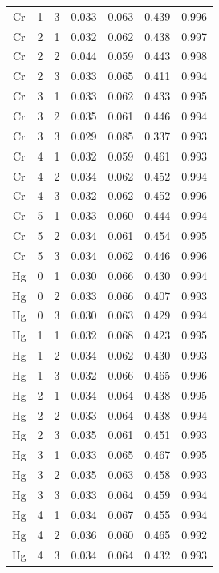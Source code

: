 \documentclass[ms, hidelinks]{uncgdissertationexp}
\theoremstyle{plain}
\theoremstyle{definition}
\theoremstyle{remark}
\begin{document}
\begin{longtable}{ccccccc}
Cr & 1 & 3 & 0.033 & 0.063 & 0.439 & 0.996\\
\rowcolor{gray!6}  Cr & 2 & 1 & 0.032 & 0.062 & 0.438 & 0.997\\
Cr & 2 & 2 & 0.044 & 0.059 & 0.443 & 0.998\\
\rowcolor{gray!6}  Cr & 2 & 3 & 0.033 & 0.065 & 0.411 & 0.994\\
Cr & 3 & 1 & 0.033 & 0.062 & 0.433 & 0.995\\
\rowcolor{gray!6}  Cr & 3 & 2 & 0.035 & 0.061 & 0.446 & 0.994\\
Cr & 3 & 3 & 0.029 & 0.085 & 0.337 & 0.993\\
\rowcolor{gray!6}  Cr & 4 & 1 & 0.032 & 0.059 & 0.461 & 0.993\\
Cr & 4 & 2 & 0.034 & 0.062 & 0.452 & 0.994\\
\rowcolor{gray!6}  Cr & 4 & 3 & 0.032 & 0.062 & 0.452 & 0.996\\
Cr & 5 & 1 & 0.033 & 0.060 & 0.444 & 0.994\\
\rowcolor{gray!6}  Cr & 5 & 2 & 0.034 & 0.061 & 0.454 & 0.995\\
Cr & 5 & 3 & 0.034 & 0.062 & 0.446 & 0.996\\
\rowcolor{gray!6}  Hg & 0 & 1 & 0.030 & 0.066 & 0.430 & 0.994\\
Hg & 0 & 2 & 0.033 & 0.066 & 0.407 & 0.993\\
\rowcolor{gray!6}  Hg & 0 & 3 & 0.030 & 0.063 & 0.429 & 0.994\\
Hg & 1 & 1 & 0.032 & 0.068 & 0.423 & 0.995\\
\rowcolor{gray!6}  Hg & 1 & 2 & 0.034 & 0.062 & 0.430 & 0.993\\
Hg & 1 & 3 & 0.032 & 0.066 & 0.465 & 0.996\\
\rowcolor{gray!6}  Hg & 2 & 1 & 0.034 & 0.064 & 0.438 & 0.995\\
Hg & 2 & 2 & 0.033 & 0.064 & 0.438 & 0.994\\
\rowcolor{gray!6}  Hg & 2 & 3 & 0.035 & 0.061 & 0.451 & 0.993\\
Hg & 3 & 1 & 0.033 & 0.065 & 0.467 & 0.995\\
\rowcolor{gray!6}  Hg & 3 & 2 & 0.035 & 0.063 & 0.458 & 0.993\\
Hg & 3 & 3 & 0.033 & 0.064 & 0.459 & 0.994\\
\rowcolor{gray!6}  Hg & 4 & 1 & 0.034 & 0.067 & 0.455 & 0.994\\
Hg & 4 & 2 & 0.036 & 0.060 & 0.465 & 0.992\\
\rowcolor{gray!6}  Hg & 4 & 3 & 0.034 & 0.064 & 0.432 & 0.993\\

\end{longtable}
\end{document}
